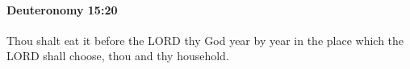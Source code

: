 
		\paragraph{Deuteronomy 15:20} %
			\label{DEUTERONOMY-15-20}

			Thou shalt eat it before the LORD thy God year by year in the place which the LORD shall choose, thou and thy household.


